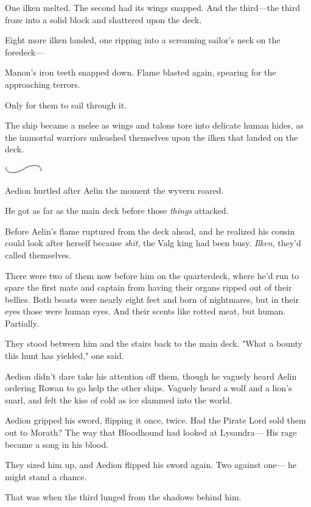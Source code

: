 One ilken melted. The second had its wings snapped. And the third---the third froze into a solid block and shattered upon the deck.

Eight more ilken landed, one ripping into a screaming sailor's neck on the foredeck---

Manon's iron teeth snapped down. Flame blasted again, spearing for the approaching terrors.

Only for them to sail through it.

The ship became a melee as wings and talons tore into delicate human hides, as the immortal warriors unleashed themselves upon the ilken that landed on the deck.

\includegraphics[width=0.65in,height=0.13in]{images/seperator}

Aedion hurtled after Aelin the moment the wyvern roared.

He got as far as the main deck before those \emph{things} attacked.

Before Aelin's flame ruptured from the deck ahead, and he realized his cousin could look after herself because \emph{shit}, the Valg king had been busy. \emph{Ilken}, they'd called themselves.

There were two of them now before him on the quarterdeck, where he'd run to spare the first mate and captain from having their organs ripped out of their bellies. Both beasts were nearly eight feet and born of nightmares, but in their eyes  those were human eyes. And their scents  like rotted meat, but  human. Partially.

They stood between him and the stairs back to the main deck. "What a bounty this hunt has yielded," one said.

Aedion didn't dare take his attention off them, though he vaguely heard Aelin ordering Rowan to go help the other ships. Vaguely heard a wolf and a lion's snarl, and felt the kiss of cold as ice slammed into the world.

Aedion gripped his sword, flipping it once, twice. Had the Pirate Lord sold them out to Morath? The way that Bloodhound had looked at Lysandra--- His rage became a song in his blood.

They sized him up, and Aedion flipped his sword again. Two against one--- he might stand a chance.

That was when the third lunged from the shadows behind him.

